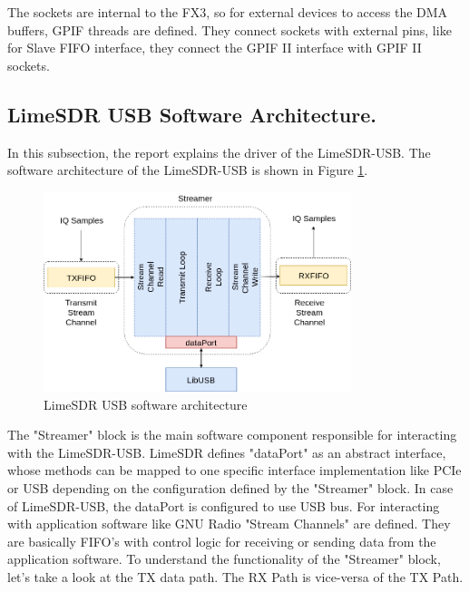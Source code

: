 The sockets are internal to the FX3, so for external devices to access the \ac{DMA} buffers, GPIF threads are defined.
They connect sockets with external pins, like for Slave FIFO interface, they connect the GPIF II interface with GPIF II sockets.\\


\subsection{LimeSDR USB Software Architecture.}

In this subsection, the report explains the driver of the LimeSDR-USB.
The software architecture of the LimeSDR-USB is shown in Figure \ref{Lime_Software}.\\

\begin{figure}[h!]
\centering
\includegraphics[width=0.8\textwidth]{Figure/Lime_Software.png}
\caption{LimeSDR USB software architecture}
\label{Lime_Software}
\end{figure}

The "Streamer" block is the main software component responsible for interacting with the LimeSDR-USB.
LimeSDR defines "dataPort" as an abstract interface, whose methods can be mapped to one specific interface implementation like \ac{PCIe} or USB depending on the configuration defined by the "Streamer" block.
In case of LimeSDR-USB, the dataPort is configured to use \ac{USB} bus.
For interacting with application software like GNU Radio "Stream Channels" are defined.
They are basically FIFO's with control logic for receiving or sending data from the application software.
To understand the functionality of the "Streamer" block, let's take a look at the TX data path.
The RX Path is vice-versa of the TX Path.\\

